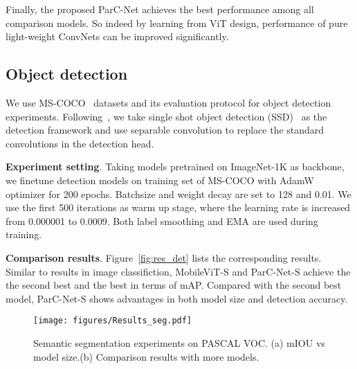 \documentclass[10pt,twocolumn,letterpaper]{article}
\begin{document}
Finally, the proposed ParC-Net achieves the best performance among all comparison models. So indeed by learning from ViT design, performance of pure light-weight ConvNets can be improved significantly. 

\subsection{Object detection}



We use MS-COCO~\cite{2014Microsoft} datasets and its evaluation protocol for object detection experiments. Following~\cite{mehta2022mobilevit}\cite{sandler2018mobilenetv2}, we take single shot object detection (SSD)~\cite{2016SSD} as the detection framework and use separable convolution to replace the standard convolutions in the detection head. 

{\bf Experiment setting}. Taking models pretrained on ImageNet-1K as backbone, we finetune detection models on training set of MS-COCO with AdamW optimizer for 200 epochs. Batchsize and weight decay are set to 128 and 0.01. We use the first 500 iterations as warm up stage, where the learning rate is increased from 0.000001 to 0.0009. Both label smoothing and EMA are used during training.  

{\bf Comparison results}. Figure~\ref{fig:res_det} lists the corresponding results. Similar to results in image classifiction, MobileViT-S and ParC-Net-S achieve the the second best and the best in terms of mAP. Compared with the second best model, ParC-Net-S shows advantages in both model size and detection accuracy.  

\begin{figure*}[t]
\setlength{\abovecaptionskip}{0.cm}
\setlength{\belowcaptionskip}{0.0cm}
\centering
\texttt{[image: figures/Results\_seg.pdf]}
\caption{Semantic segmentation experiments on PASCAL VOC. (a) mIOU vs model size.(b) Comparison results with more models.}
\label{fig:res_seg}
\end{figure*}
\end{document}
